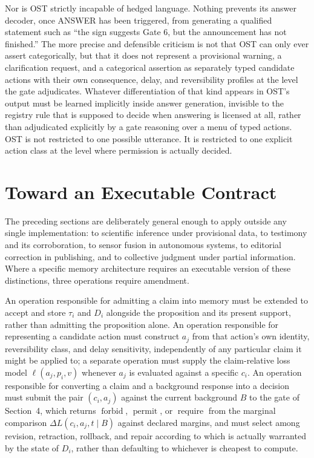 \documentclass[11pt]{article}
\begin{document}
Nor is OST strictly incapable of hedged language. Nothing prevents its answer decoder, once ANSWER has been triggered, from generating a qualified statement such as ``the sign suggests Gate 6, but the announcement has not finished.'' The more precise and defensible criticism is not that OST can only ever assert categorically, but that it does not represent a provisional warning, a clarification request, and a categorical assertion as separately typed candidate actions with their own consequence, delay, and reversibility profiles at the level the gate adjudicates. Whatever differentiation of that kind appears in OST's output must be learned implicitly inside answer generation, invisible to the registry rule that is supposed to decide when answering is licensed at all, rather than adjudicated explicitly by a gate reasoning over a menu of typed actions. OST is not restricted to one possible utterance. It is restricted to one explicit action class at the level where permission is actually decided.

\section{Toward an Executable Contract}

The preceding sections are deliberately general enough to apply outside any single implementation: to scientific inference under provisional data, to testimony and its corroboration, to sensor fusion in autonomous systems, to editorial correction in publishing, and to collective judgment under partial information. Where a specific memory architecture requires an executable version of these distinctions, three operations require amendment.

An operation responsible for admitting a claim into memory must be extended to accept and store $\tau_i$ and $D_i$ alongside the proposition and its present support, rather than admitting the proposition alone. An operation responsible for representing a candidate action must construct $a_j$ from that action's own identity, reversibility class, and delay sensitivity, independently of any particular claim it might be applied to; a separate operation must supply the claim-relative loss model $\ell(a_j, p_i, v)$ whenever $a_j$ is evaluated against a specific $c_i$. An operation responsible for converting a claim and a background response into a decision must submit the pair $(c_i, a_j)$ against the current background $B$ to the gate of Section~4, which returns $\operatorname{forbid}$, $\operatorname{permit}$, or $\operatorname{require}$ from the marginal comparison $\Delta L(c_i, a_j, t \mid B)$ against declared margins, and must select among revision, retraction, rollback, and repair according to which is actually warranted by the state of $D_i$, rather than defaulting to whichever is cheapest to compute.
\end{document}
